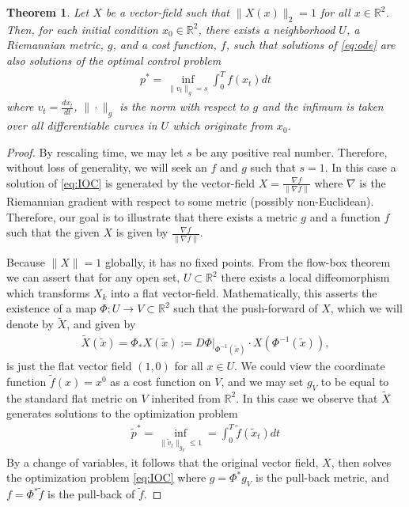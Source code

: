 \documentclass[conference]{IEEEtran}
\newtheorem{thm}{Theorem}
\begin{document}
\begin{thm}
	Let $X$ be a vector-field such that $\| X(x) \|_2 = 1$ for all $x \in \mathbb{R}^2$.
Then, for each initial condition $x_0 \in \mathbb{R}^2$, there exists a neighborhood $U$, a Riemannian metric, $g$, and a cost function, $f$, 
such that solutions of \eqref{eq:ode} are also solutions of the optimal control problem
\begin{align}
	p^* = \inf_{ \| v_t \|_g = s } \int_0^T f( x_t) dt \label{eq:IOC}
\end{align}
where $v_t = \frac{d x_t}{dt}$, $\| \cdot \|_g$ is the norm with respect to $g$ and the infimum is taken over all differentiable curves in $U$ which originate from $x_0$.
\end{thm}

\begin{proof}
	By rescaling time, we may let $s$ be any positive real number.
	Therefore, without loss of generality, we will seek an $f$ and $g$ such that $s=1$.
	In this case a solution of \eqref{eq:IOC} is generated by the vector-field $X = \frac{\nabla f}{ \| \nabla f\|}$ where $\nabla$ is the Riemannian gradient with respect to some metric (possibly non-Euclidean).
	Therefore, our goal is to illustrate that there exists a metric $g$ and a function $f$ such that the given $X$ is given by $\frac{\nabla f}{ \| \nabla f\|}$.

	Because $\| X \| = 1$ globally, it has no fixed points.
	From the flow-box theorem \cite[Theorem 4.1.14]{MTA} we can assert that for any open set, $U \subset \mathbb{R}^2$ there exists a local diffeomorphism which transforms $X_k$ into a flat vector-field.
	Mathematically, this asserts the existence of a map $\Phi : U \to V \subset \mathbb{R}^2$ such that the push-forward of $X$, which we will denote by $\tilde{X}$, and given by
	\begin{align*}
		\tilde{X}(\tilde{x}) = \Phi_* X(\tilde{x}) := \left. D\Phi \right|_{\Phi^{-1}(\tilde{x}) } \cdot X(  \Phi^{-1}(\tilde{x}) ),
	\end{align*}
	is just the flat vector field $(1,0)$ for all $x \in U$.
	We could view the coordinate function $\tilde{f}(x) = x^0$ as a cost function on $V$,
	and we may set $g_V$ to be equal to the standard flat metric on $V$ inherited from $\mathbb{R}^2$.
	In this case we observe that $\tilde{X}$ generates solutions to the optimization problem
	\begin{align*}
		\tilde{p}^* = \inf_{ \| \tilde{v}_t \|_{g_V} \leq 1} = \int_0^T \tilde{f}( \tilde{x}_t ) dt
	\end{align*}
	By a change of variables, it follows that the original vector field, $X$, then solves the optimization problem \eqref{eq:IOC}
	where $g = \Phi^* g_V$ is the pull-back metric, and $f = \Phi^* \tilde{f}$ is the pull-back of $\tilde{f}$.
\end{proof}





\end{document}
